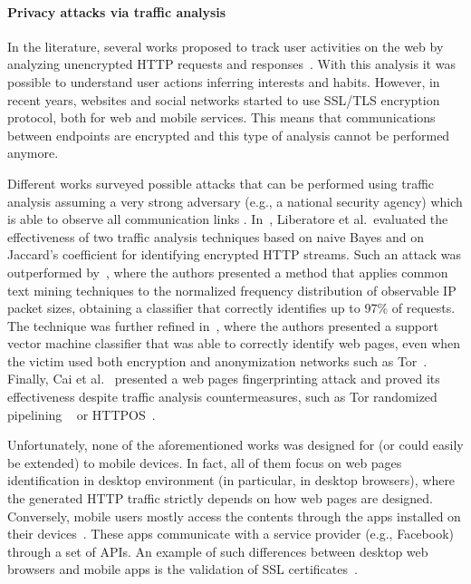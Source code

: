 \documentclass{acm_proc_article-sp}
\newcommand{\hilight}[1]{#1}
\begin{document}
\paragraph{Privacy attacks via traffic analysis}

In the literature, several works proposed to track user activities on the web 
by analyzing unencrypted HTTP requests and responses~\cite{Atterer:2006:KUM:1135777.1135811,Schneider:2009:UOS:1644893.1644899,Benevenuto:2012:CUN:2169463.2169583}.
With this analysis it was possible to understand user actions inferring interests and habits. 
However, in recent years, websites and social networks started to use SSL/TLS encryption protocol, 
both for web and mobile services. This means that communications between endpoints are encrypted and this type of analysis cannot be performed anymore. 

Different works surveyed possible attacks that can be performed using traffic analysis assuming a 
very strong adversary (e.g., a national security agency) which is able to observe all communication 
links \cite{Raymond:2001:TAP:371931.371972,Berthold:2000:PLU:332186.332211}.
In~\cite{Liberatore:2006:ISE:1180405.1180437}, Liberatore et al.\ evaluated the effectiveness of two traffic analysis 
techniques based on naive Bayes and on Jaccard’s coefficient for identifying encrypted HTTP streams. 
Such an attack was outperformed by~\cite{Herrmann:2009:WFA:1655008.1655013}, where the authors presented 
a method that applies common text mining techniques to the normalized frequency distribution of observable 
IP packet sizes, obtaining a classifier that correctly identifies up to 97\% of requests.
The technique was further refined in~\cite{Panchenko:2011:WFO:2046556.2046570}, where the authors presented a support 
vector machine classifier that was able to correctly identify web pages, even when the victim used both encryption and 
anonymization networks such as Tor~\cite{Dingledine:2004:TSO:1251375}.
\hilight{Finally, Cai et al.}~\cite{cai2012touching} 
\hilight{ presented a web pages fingerprinting attack and proved its effectiveness despite traffic analysis countermeasures, such as Tor randomized pipelining} ~\cite{tor:websites:fingerprint} or HTTPOS~\cite{Luo11httpos:sealing}.

Unfortunately, none of the aforementioned works was designed for (or could easily be extended) to mobile devices. In fact, all of them focus on web pages identification in desktop environment (in particular, in desktop browsers), where the generated HTTP traffic strictly depends on how web pages are designed. Conversely, mobile users mostly access the contents through the apps installed on their devices~\cite{Go:2013:TAA:2444776.2444779}. These apps communicate with a service provider (e.g., Facebook) through a set of APIs.
\hilight{An example of such differences between desktop web browsers and mobile apps is the validation of SSL certificates}~\cite{Georgiev:2012:MDC:2382196.2382204,DBLP:ContiDG13mithys}.
\end{document}
